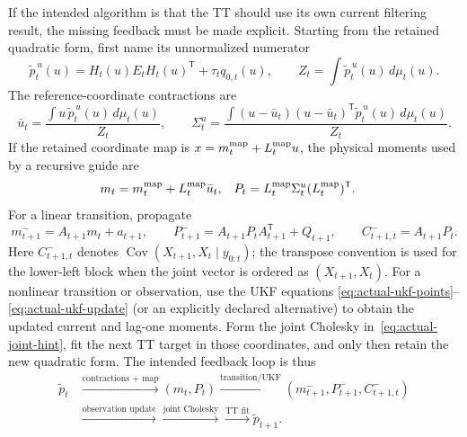 \documentclass[11pt]{article}
\begin{document}
If the intended algorithm is that the TT should use its own current filtering
result, the missing feedback must be made explicit.  Starting from the
retained quadratic form, first name its unnormalized numerator
\begin{equation}
  \widetilde p_t^{\,u}(u)=H_t(u)E_tH_t(u)^\mathsf T+\tau_tq_{0,t}(u),
  \qquad
  Z_t=\int\widetilde p_t^{\,u}(u)\,d\mu_t(u).
  \label{eq:actual-unnormalized-retained}
\end{equation}
The reference-coordinate contractions are
\begin{equation}
  \bar u_t=\frac{\int u\,\widetilde p_t^{\,u}(u)\,d\mu_t(u)}{Z_t},
  \qquad
  \Sigma_t^u=\frac{\int
    (u-\bar u_t)(u-\bar u_t)^\mathsf T\widetilde p_t^{\,u}(u)\,d\mu_t(u)}
    {Z_t}.
  \label{eq:actual-reference-moments}
\end{equation}
If the retained coordinate map is $x=m_t^{\rm map}+L_t^{\rm map}u$, the
physical moments used by a recursive guide are
\begin{align}
  m_t&=m_t^{\rm map}+L_t^{\rm map}\bar u_t,&
  P_t&=L_t^{\rm map}\Sigma_t^u(L_t^{\rm map})^\mathsf T.
  \label{eq:actual-recursive-moments}
\end{align}
For a linear transition, propagate
\begin{equation}
  m_{t+1}^-=A_{t+1}m_t+a_{t+1},
  \qquad
  P_{t+1}^-=A_{t+1}P_tA_{t+1}^\mathsf T+Q_{t+1},
  \qquad
  C_{t+1,t}^-=A_{t+1}P_t.
  \label{eq:actual-recursive-prediction}
\end{equation}
Here $C_{t+1,t}^-$ denotes
$\operatorname{Cov}(X_{t+1},X_t\mid y_{0:t})$; the transpose convention is
used for the lower-left block when the joint vector is ordered as
$(X_{t+1},X_t)$.
For a nonlinear transition or observation, use the UKF equations
\eqref{eq:actual-ukf-points}--\eqref{eq:actual-ukf-update} (or an explicitly
declared alternative) to obtain the updated current and lag-one moments.  Form
the joint Cholesky in~\eqref{eq:actual-joint-hint}, fit the next TT target in
those coordinates, and only then retain the new quadratic form.  The intended
feedback loop is thus
\begin{equation}
  \begin{aligned}
  \widetilde p_t
  &\xrightarrow{\text{contractions + map}}(m_t,P_t)
   \xrightarrow{\text{transition/UKF}}
   (m_{t+1}^-,P_{t+1}^-,C_{t+1,t}^-)\\
  &\xrightarrow{\text{observation update}}
   \xrightarrow{\text{joint Cholesky}}
   \xrightarrow{\text{TT fit}}\widetilde p_{t+1}.
  \end{aligned}
  \label{eq:actual-feedback-loop}
\end{equation}
\end{document}

